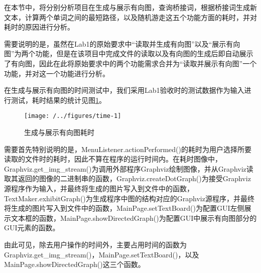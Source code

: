在本节中，将分别分析项目在生成与展示有向图，查询桥接词，根据桥接词生成新文本，计算两个单词之间的最短路径，以及随机游走这五个功能方面的耗时，并对耗时的原因进行分析。

需要说明的是，虽然在Lab1的原始要求中“读取并生成有向图”以及“展示有向图”为两个功能，但是在该项目中完成文件的读取以及有向图的生成后即自动展示了有向图，因此在此将原始要求中的两个功能需求合并为“读取并展示有向图”一个功能，并对这一个功能进行分析。

在生成与展示有向图的时间测试中，我们采用Lab1验收时的测试数据作为输入进行测试，耗时结果的统计见图\ref{fig:time-1}。

\begin{figure}
\centering
\texttt{[image: /../figures/time-1]}
\caption{生成与展示有向图耗时}
\label{fig:time-1}
\end{figure}

需要首先特别说明的是，MenuListener.actionPerformed()的耗时为用户选择所要读取的文件时的耗时，因此不算在程序的运行时间内。在耗时图像中，Graphviz.get\_img\_stream()为调用外部程序Graphviz绘制图像，并从Graphviz读取其返回的图像的二进制串的函数，Graphviz.createDotGraph()为接受Graphviz源程序作为输入，并最终将生成的图片写入到文件中的函数，TextMaker.exhibitGraph()为生成程序中图的结构对应的Graphviz源程序，并最终将生成的图片写入到文件中的函数，MainPage.setTextBoard()为配置GUI左侧展示文本框的函数，MainPage.showDirectedGraph()为配置GUI中展示有向图部分的GUI元素的函数。

由此可见，除去用户操作的时间外，主要占用时间的函数为Graphviz.get\_img\_stream()，MainPage.setTextBoard()，以及MainPage.showDirectedGraph()这三个函数。







